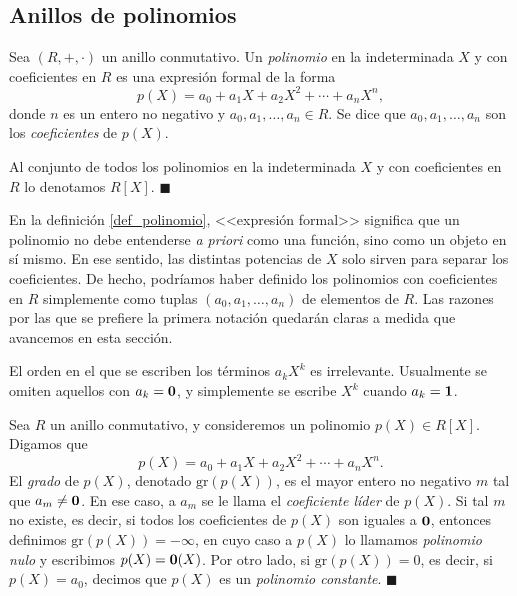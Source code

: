 \subsection{Anillos de polinomios}

\begin{definition} \label{def_polinomio}
Sea $(R, +, \cdot)$ un anillo conmutativo. Un \emph{polinomio} en la indeterminada $X$ y con coeficientes en $R$ es una expresión formal de la forma
$$p(X) = a_0 + a_1X + a_2X^2 + \cdots + a_n X^n,$$
donde $n$ es un entero no negativo y $a_0, a_1, \dots, a_n \in R$. Se dice que $a_0, a_1, \dots, a_n$ son los \emph{coeficientes} de $p(X)$.

Al conjunto de todos los polinomios en la indeterminada $X$ y con coeficientes en $R$ lo denotamos $R[X]$. 
\hfill$\blacksquare$
\end{definition}

En la definición \ref{def_polinomio}, <<expresión formal>> significa que un polinomio no debe entenderse \textit{a priori} como una función, sino como un objeto en sí mismo. En ese sentido, las distintas potencias de $X$ solo sirven para separar los coeficientes. De hecho, podríamos haber definido los polinomios con coeficientes en $R$ simplemente como tuplas $(a_0, a_1, \dots, a_n)$ de elementos de $R$. Las razones por las que se prefiere la primera notación quedarán claras a medida que avancemos en esta sección.

El orden en el que se escriben los términos $a_k X^k$ es irrelevante. Usualmente se omiten aquellos con $a_k=\mathbf{0}$, y simplemente se escribe $X^k$ cuando $a_k = \mathbf{1}$.

\begin{definition}
Sea $R$ un anillo conmutativo, y consideremos un polinomio $p(X) \in R[X]$. Digamos que
$$p(X) = a_0 + a_1X + a_2X^2 + \cdots + a_n X^n.$$
El \emph{grado} de $p(X)$, denotado $\mathrm{gr}(p(X))$, es el mayor entero no negativo $m$ tal que $a_m \neq \mathbf{0}$. En ese caso, a $a_m$ se le llama el \emph{coeficiente líder} de $p(X)$. Si tal $m$ no existe, es decir, si todos los coeficientes de $p(X)$ son iguales a $\mathbf{0}$, entonces definimos $\mathrm{gr}(p(X)) = -\infty$, en cuyo caso a $p(X)$ lo llamamos \emph{polinomio nulo} y escribimos $p(X) = \mathbf{0}(X)$. Por otro lado, si $\mathrm{gr}(p(X)) = 0$, es decir, si $p(X) = a_0$, decimos que $p(X)$ es un \emph{polinomio constante}.
\hfill$\blacksquare$
\end{definition}

